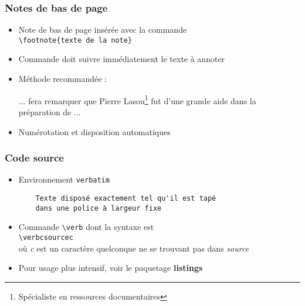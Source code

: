 
\begin{frame}[fragile]

	\frametitle{Notes de bas de page}
	
	\begin{itemize}
		\item Note de bas de page insérée avec la commande \\
			\lstinline|\footnote{texte de la note}|
			
		\item Commande doit suivre immédiatement le texte à annoter
		
		\item Méthode recommandée : 
		\begin{codesource}
	... fera remarquer que Pierre Lasou\footnote{%
	Spécialiste en ressources documentaires} %
	fut d'une grande aide dans la préparation de ...
		\end{codesource}
				
		\item Numérotation et disposition automatiques
	\end{itemize}
\end{frame}


\begin{frame}[fragile]

	\frametitle{Code source}
	
	\begin{itemize}
		\item Environnement \texttt{verbatim}
		\begin{codesource}
	\begin{verbatim}
	Texte disposé exactement tel qu'il est tapé
	dans une police à largeur fixe
	\end{verbatim}
		\end{codesource}
	
		\item Commande \texttt{\textbackslash verb} dont la syntaxe est \\
			\lstinline|\verbcsourcec| \\
			où \textit{c} est un caractère quelconque ne se trouvant pas dans \textit{source}
			
		\item Pour usage plus intensif, voir le paquetage \textbf{listings}
	\end{itemize}
\end{frame}

